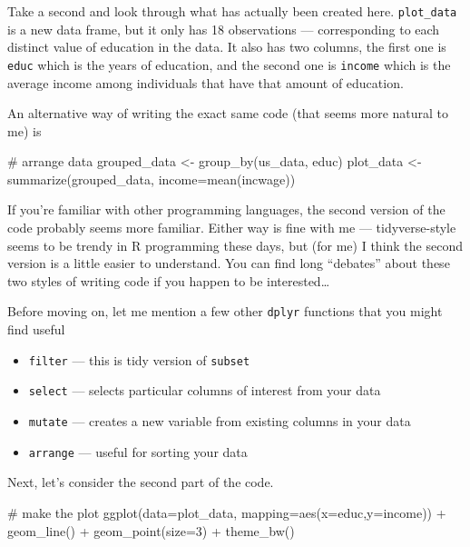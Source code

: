 \documentclass[
  letterpaper,
  DIV=11,
  numbers=noendperiod]{scrreprt}
\newenvironment{Shaded}{\begin{snugshade}}{\end{snugshade}}
\newcommand{\AttributeTok}[1]{\textcolor[rgb]{0.40,0.45,0.13}{#1}}
\newcommand{\CommentTok}[1]{\textcolor[rgb]{0.37,0.37,0.37}{#1}}
\newcommand{\DecValTok}[1]{\textcolor[rgb]{0.68,0.00,0.00}{#1}}
\newcommand{\FunctionTok}[1]{\textcolor[rgb]{0.28,0.35,0.67}{#1}}
\newcommand{\NormalTok}[1]{\textcolor[rgb]{0.00,0.23,0.31}{#1}}
\newcommand{\OtherTok}[1]{\textcolor[rgb]{0.00,0.23,0.31}{#1}}
\newcommand{\SpecialCharTok}[1]{\textcolor[rgb]{0.37,0.37,0.37}{#1}}
\begin{document}
Take a second and look through what has actually been created here.
\texttt{plot\_data} is a new data frame, but it only has 18 observations
--- corresponding to each distinct value of education in the data. It
also has two columns, the first one is \texttt{educ} which is the years
of education, and the second one is \texttt{income} which is the average
income among individuals that have that amount of education.

An alternative way of writing the exact same code (that seems more
natural to me) is

\begin{Shaded}
\begin{Highlighting}[]
\CommentTok{\# arrange data}
\NormalTok{grouped\_data }\OtherTok{\textless{}{-}} \FunctionTok{group\_by}\NormalTok{(us\_data, educ)}
\NormalTok{plot\_data }\OtherTok{\textless{}{-}} \FunctionTok{summarize}\NormalTok{(grouped\_data, }\AttributeTok{income=}\FunctionTok{mean}\NormalTok{(incwage))}
\end{Highlighting}
\end{Shaded}

If you're familiar with other programming languages, the second version
of the code probably seems more familiar. Either way is fine with me ---
tidyverse-style seems to be trendy in R programming these days, but (for
me) I think the second version is a little easier to understand. You can
find long ``debates'' about these two styles of writing code if you
happen to be interested\ldots{}

Before moving on, let me mention a few other \texttt{dplyr} functions
that you might find useful

\begin{itemize}
\item
  \texttt{filter} --- this is tidy version of \texttt{subset}
\item
  \texttt{select} --- selects particular columns of interest from your
  data
\item
  \texttt{mutate} --- creates a new variable from existing columns in
  your data
\item
  \texttt{arrange} --- useful for sorting your data
\end{itemize}

Next, let's consider the second part of the code.

\begin{Shaded}
\begin{Highlighting}[]
\CommentTok{\# make the plot}
\FunctionTok{ggplot}\NormalTok{(}\AttributeTok{data=}\NormalTok{plot\_data,}
       \AttributeTok{mapping=}\FunctionTok{aes}\NormalTok{(}\AttributeTok{x=}\NormalTok{educ,}\AttributeTok{y=}\NormalTok{income)) }\SpecialCharTok{+}
    \FunctionTok{geom\_line}\NormalTok{() }\SpecialCharTok{+}
    \FunctionTok{geom\_point}\NormalTok{(}\AttributeTok{size=}\DecValTok{3}\NormalTok{) }\SpecialCharTok{+}
    \FunctionTok{theme\_bw}\NormalTok{()}
\end{Highlighting}
\end{Shaded}
\end{document}
